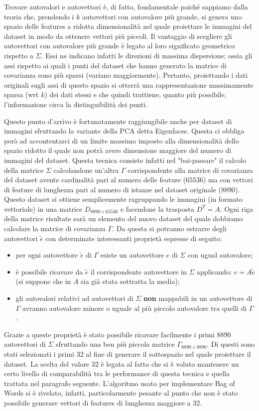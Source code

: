 \documentclass[]{report}
\begin{document}
	Trovare autovalori e autovettori è, di fatto, fondamentale poiché sappiamo dalla teoria che, prendendo i $k$ autovettori con autovalore più grande, si genera uno spazio delle features a ridotta dimensionalità nel quale proiettare le immagini del dataset in modo da ottenere vettori più piccoli. Il vantaggio di scegliere gli autovettori con autovalore più grande è legato al loro significato geometrico rispetto a $\Sigma$. Essi ne indicano infatti le direzioni di massima dispersione; ossia gli assi rispetto ai quali i punti del dataset che hanno generato la matrice di covarianza sono più sparsi (variano maggiormente). Pertanto, proiettando i dati originali sugli assi di questo spazio si otterrà una rappresentazione massimamente sparsa (wrt $k$) dei dati stessi e che quindi trattiene, quanto più possibile, l'informazione circa la distinguibilità dei punti. 
	
	Questo punto d'arrivo è fortunatamente raggiungibile anche per dataset di immagini sfruttando la variante della PCA detta Eigenfaces. Questa ci obbliga però ad accontentarci di un limite massimo imposto alla dimensionalità dello spazio ridotto il quale non potrà avere dimensione maggiore del numero di immagini del dataset.
	Questa tecnica consiste infatti nel "bai-passare" il calcolo della matrice $\Sigma$ calcolandone un'altra $\Gamma$ corrispondente alla matrice di covarianza del dataset avente cardinalità pari al numero delle feature ($65536$) ma con vettori di feature di lunghezza pari al numero di istanze nel dataset originale ($8890$). Questo dataset si ottiene semplicemente ragruppando le immagini (in formato vettoriale) in una matrice $D_{8890\times65536}$ e facendone la trasposta $D^{T} = A$. Ogni riga della matrice risultate sarà un elemento del nuovo dataset del quale dobbiamo calcolare la matrice di covarianza $\Gamma$. Da questa si potranno estrarre degli autovettori $\tilde{e}$ con determinate interessanti proprietà espresse di seguito:
	\begin{itemize}
		\item per ogni autovettore $\tilde{e}$ di $\Gamma$ esiste un autovettore $e$ di $\Sigma$ con ugual autovalore; 
		\item è possibile ricavare da $\tilde{e}$ il corrispondente autovettore in $\Sigma$ applicando: $e = A\tilde{e}$ (si suppone che in $A$ sia già stata sottratta la media);
		\item gli autovalori relativi ad autovettori di $\Sigma$ {\bf non} mappabili in un autovettore di $\Gamma$ avranno autovalore minore o uguale al più piccolo autovalore tra quelli di $\Gamma$.
	\end{itemize}
	Grazie a queste proprietà è stato possibile ricavare facilmente i primi $8890$ autovettori di $\Sigma$ sfruttando una ben più piccola matrice $\Gamma_{8890\times8890}$. Di questi sono stati selezionati i primi 32 al fine di generare il sottospazio nel quale proiettare il dataset. La scelta del valore 32 è legata al fatto che si è voluto mantenere un certo livello di comparabilità tra le performance di questa tecnica e quella trattata nel paragrafo seguente. L'algoritmo usato per implementare Bag of Words si è rivelato, infatti, particolarmente pesante al punto che non è stato possibile generare vettori di features di lunghezza maggiore a $32$. 
	
\end{document}
